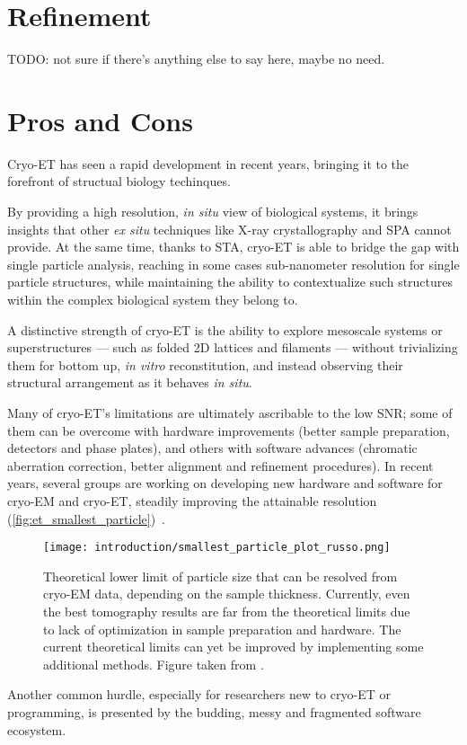\section{Refinement}\label{et_refinement}

TODO: not sure if there's anything else to say here, maybe no need.

\section{Pros and Cons}

Cryo-ET has seen a rapid development in recent years, bringing it to the forefront of structual biology techinques.

By providing a high resolution, \textit{in situ} view of biological systems, it brings insights that other \textit{ex situ} techniques like X-ray crystallography and SPA cannot provide.
At the same time, thanks to STA, cryo-ET is able to bridge the gap with single particle analysis, reaching in some cases sub-nanometer resolution for single particle structures, while maintaining the ability to contextualize such structures within the complex biological system they belong to.

A distinctive strength of cryo-ET is the ability to explore mesoscale systems or superstructures --- such as folded 2D lattices and filaments --- without trivializing them for bottom up, \textit{in vitro} reconstitution, and instead observing their structural arrangement as it behaves \textit{in situ}.

Many of cryo-ET's limitations are ultimately ascribable to the low SNR; some of them can be overcome with hardware improvements (better sample preparation, detectors and phase plates), and others with software advances (chromatic aberration correction, better alignment and refinement procedures).
In recent years, several groups are working on developing new hardware and software for cryo-EM and cryo-ET, steadily improving the attainable resolution (\autoref{fig:et_smallest_particle})~\cite{russoCryomicroscopySituWhat2022}.

\begin{figure}[ht]
    \centering
    \texttt{[image: introduction/smallest\_particle\_plot\_russo.png]}
    \caption[Particle size limit versus sample thickness]{Theoretical lower limit of particle size that can be resolved from cryo-EM data, depending on the sample thickness. Currently, even the best tomography results are far from the theoretical limits due to lack of optimization in sample preparation and hardware. The current theoretical limits can yet be improved by implementing some additional methods. Figure taken from \citet{russoElectronCryomicroscopeHardware2023}.}
    \label{fig:et_smallest_particle}
\end{figure}

Another common hurdle, especially for researchers new to cryo-ET or programming, is presented by the budding, messy and fragmented software ecosystem. 
